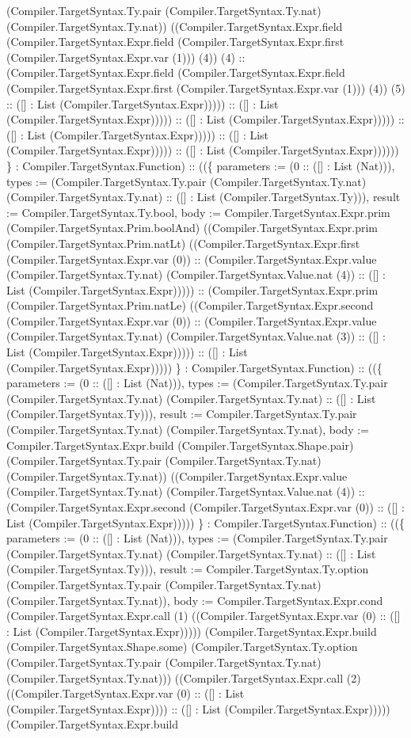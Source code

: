\documentclass[11pt]{article}
\begin{document}
(Compiler.TargetSyntax.Ty.pair (Compiler.TargetSyntax.Ty.nat) (Compiler.TargetSyntax.Ty.nat)) ((Compiler.TargetSyntax.Expr.field (Compiler.TargetSyntax.Expr.field (Compiler.TargetSyntax.Expr.first (Compiler.TargetSyntax.Expr.var (1))) (4)) (4) :: (Compiler.TargetSyntax.Expr.field (Compiler.TargetSyntax.Expr.field (Compiler.TargetSyntax.Expr.first (Compiler.TargetSyntax.Expr.var (1))) (4)) (5) :: ([] : List (Compiler.TargetSyntax.Expr))))) :: ([] : List (Compiler.TargetSyntax.Expr))))) :: ([] : List (Compiler.TargetSyntax.Expr))))) :: ([] : List (Compiler.TargetSyntax.Expr))))) :: ([] : List (Compiler.TargetSyntax.Expr))))) :: ([] : List (Compiler.TargetSyntax.Expr)))))) \} : Compiler.TargetSyntax.Function) :: ((\{ parameters := (0 :: ([] : List (Nat))), types := (Compiler.TargetSyntax.Ty.pair (Compiler.TargetSyntax.Ty.nat) (Compiler.TargetSyntax.Ty.nat) :: ([] : List (Compiler.TargetSyntax.Ty))), result := Compiler.TargetSyntax.Ty.bool, body := Compiler.TargetSyntax.Expr.prim (Compiler.TargetSyntax.Prim.boolAnd) ((Compiler.TargetSyntax.Expr.prim (Compiler.TargetSyntax.Prim.natLt) ((Compiler.TargetSyntax.Expr.first (Compiler.TargetSyntax.Expr.var (0)) :: (Compiler.TargetSyntax.Expr.value (Compiler.TargetSyntax.Ty.nat) (Compiler.TargetSyntax.Value.nat (4)) :: ([] : List (Compiler.TargetSyntax.Expr))))) :: (Compiler.TargetSyntax.Expr.prim (Compiler.TargetSyntax.Prim.natLe) ((Compiler.TargetSyntax.Expr.second (Compiler.TargetSyntax.Expr.var (0)) :: (Compiler.TargetSyntax.Expr.value (Compiler.TargetSyntax.Ty.nat) (Compiler.TargetSyntax.Value.nat (3)) :: ([] : List (Compiler.TargetSyntax.Expr))))) :: ([] : List (Compiler.TargetSyntax.Expr))))) \} : Compiler.TargetSyntax.Function) :: ((\{ parameters := (0 :: ([] : List (Nat))), types := (Compiler.TargetSyntax.Ty.pair (Compiler.TargetSyntax.Ty.nat) (Compiler.TargetSyntax.Ty.nat) :: ([] : List (Compiler.TargetSyntax.Ty))), result := Compiler.TargetSyntax.Ty.pair (Compiler.TargetSyntax.Ty.nat) (Compiler.TargetSyntax.Ty.nat), body := Compiler.TargetSyntax.Expr.build (Compiler.TargetSyntax.Shape.pair) (Compiler.TargetSyntax.Ty.pair (Compiler.TargetSyntax.Ty.nat) (Compiler.TargetSyntax.Ty.nat)) ((Compiler.TargetSyntax.Expr.value (Compiler.TargetSyntax.Ty.nat) (Compiler.TargetSyntax.Value.nat (4)) :: (Compiler.TargetSyntax.Expr.second (Compiler.TargetSyntax.Expr.var (0)) :: ([] : List (Compiler.TargetSyntax.Expr))))) \} : Compiler.TargetSyntax.Function) :: ((\{ parameters := (0 :: ([] : List (Nat))), types := (Compiler.TargetSyntax.Ty.pair (Compiler.TargetSyntax.Ty.nat) (Compiler.TargetSyntax.Ty.nat) :: ([] : List (Compiler.TargetSyntax.Ty))), result := Compiler.TargetSyntax.Ty.option (Compiler.TargetSyntax.Ty.pair (Compiler.TargetSyntax.Ty.nat) (Compiler.TargetSyntax.Ty.nat)), body := Compiler.TargetSyntax.Expr.cond (Compiler.TargetSyntax.Expr.call (1) ((Compiler.TargetSyntax.Expr.var (0) :: ([] : List (Compiler.TargetSyntax.Expr))))) (Compiler.TargetSyntax.Expr.build (Compiler.TargetSyntax.Shape.some) (Compiler.TargetSyntax.Ty.option (Compiler.TargetSyntax.Ty.pair (Compiler.TargetSyntax.Ty.nat) (Compiler.TargetSyntax.Ty.nat))) ((Compiler.TargetSyntax.Expr.call (2) ((Compiler.TargetSyntax.Expr.var (0) :: ([] : List (Compiler.TargetSyntax.Expr)))) :: ([] : List (Compiler.TargetSyntax.Expr))))) (Compiler.TargetSyntax.Expr.build 
\end{document}
